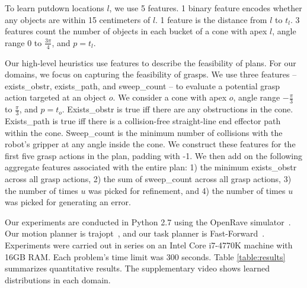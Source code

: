 To learn putdown locations $l$, we use 5 features. 1 binary feature encodes whether
any objects are within 15 centimeters of $l$. 1 feature is the
distance from $l$ to $t_{l}$. 3 features count the number of objects
in each bucket of a cone with apex $l$, angle range 0 to $\frac{3\pi}{4}$, and $p = t_{l}$.

Our high-level heuristics use features to describe the feasibility of
plans. For our domains, we focus on capturing the feasibility of
grasps. We use three features -- exists\_obstr, exists\_path, and sweep\_count -- to evaluate a potential grasp action
targeted at an object $o$. We consider a cone with apex $o$, angle
range $-\frac{\pi}{3}$ to $\frac{\pi}{3}$, and $p = t_{o}$.
Exists\_obstr is true iff there are any obstructions in the
cone. Exists\_path is true iff there is a collision-free straight-line end effector path
within the cone. Sweep\_count is the minimum number of collisions with
the robot's gripper at any angle inside the cone. We construct
these features for the first five grasp actions in the plan, padding
with -1. We then add on the following aggregate features associated
with the entire plan: 1) the minimum exists\_obstr across all grasp
actions, 2) the sum of sweep\_count across all grasp actions, 3) the
number of times $u$ was picked for refinement, and 4) the number of
times $u$ was picked for generating an error.

Our experiments are conducted in Python 2.7 using the OpenRave
simulator~\cite{Diankov_2008_6117}.  Our motion planner is
trajopt~\cite{schulman2013finding}, and our task planner is
Fast-Forward~\cite{FF}. Experiments were carried out in series on an
Intel Core i7-4770K machine with 16GB RAM. Each problem's time limit
was 300 seconds. Table \ref{table:results} summarizes quantitative
results. The supplementary video shows learned distributions in each domain.

